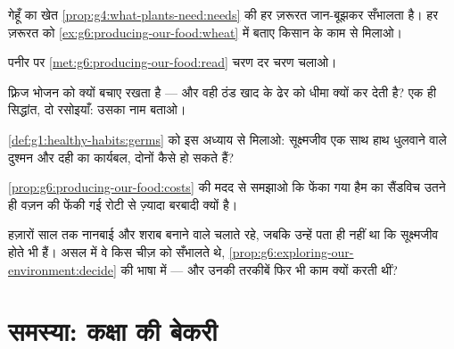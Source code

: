 \begin{exercise}[$\star\star$]\label{exo:g6:producing-our-food:7}
गेहूँ का खेत \cref{prop:g4:what-plants-need:needs} की हर ज़रूरत
जान-बूझकर सँभालता है। हर ज़रूरत को
\cref{ex:g6:producing-our-food:wheat} में बताए किसान के काम से मिलाओ।
\end{exercise}

\begin{exercise}[$\star\star$]\label{exo:g6:producing-our-food:8}
पनीर पर \cref{met:g6:producing-our-food:read} चरण दर चरण चलाओ।
\end{exercise}

\begin{exercise}[$\star\star$]\label{exo:g6:producing-our-food:9}
फ़्रिज भोजन को क्यों बचाए रखता है --- और वही ठंड खाद के ढेर को धीमा
क्यों कर देती है? एक ही सिद्धांत, दो रसोइयाँ: उसका नाम बताओ।
\end{exercise}

\begin{exercise}[$\star\star$]\label{exo:g6:producing-our-food:10}
\cref{def:g1:healthy-habits:germs} को इस अध्याय से मिलाओ: सूक्ष्मजीव
एक साथ हाथ धुलवाने वाले दुश्मन और दही का कार्यबल, दोनों कैसे हो सकते
हैं?
\end{exercise}

\begin{exercise}[$\star\star$]\label{exo:g6:producing-our-food:11}
\cref{prop:g6:producing-our-food:costs} की मदद से समझाओ कि फेंका गया
हैम का सैंडविच उतने ही वज़न की फेंकी गई रोटी से ज़्यादा बरबादी क्यों
है।
\end{exercise}

\begin{exercise}[$\star\star\star$]\label{exo:g6:producing-our-food:12}
हज़ारों साल तक नानबाई और शराब बनाने वाले  चलाते रहे, जबकि उन्हें
पता ही नहीं था कि सूक्ष्मजीव होते भी हैं। असल में वे किस चीज़ को
सँभालते थे, \cref{prop:g6:exploring-our-environment:decide} की भाषा
में --- और उनकी तरकीबें फिर भी काम क्यों करती थीं?
\end{exercise}

\section{समस्या: कक्षा की बेकरी}

